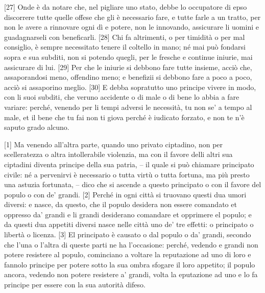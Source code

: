 {[}27{]} Onde è da notare che, nel pigliare uno stato, debbe lo
occupatore di epso discorrere tutte quelle offese che gli è necessario
fare, e tutte farle a un tratto, per non le avere a rinnovare ogni dì e
potere, non le innovando, assicurare li uomini e guadagnarseli con
beneficarli. {[}28{]} Chi fa altrimenti, o per timidità o per mal
consiglio, è sempre necessitato tenere il coltello in mano; né mai può
fondarsi sopra e sua subditi, non si potendo quegli, per le fresche e
continue iniurie, mai assicurare di lui. {[}29{]} Per che le iniurie si
debbono fare tutte insieme, acciò che, assaporandosi meno, offendino
meno; e benefizii si debbono fare a poco a poco, acciò si assaporino
meglio. {[}30{]} E debba sopratutto uno principe vivere in modo, con li
suoi subditi, che veruno accidente o di male o di bene lo abbia a fare
variare: perché, venendo per li tempi adversi le necessità, tu non se' a
tempo al male, et il bene che tu fai non ti giova perché è iudicato
forzato, e non te n'è saputo grado alcuno.


{[}1{]} Ma venendo all'altra parte, quando uno privato ciptadino, non
per scelleratezza o altra intollerabile violenzia, ma con il favore
delli altri sua ciptadini diventa principe della sua patria, -- il quale
si può chiamare principato civile: né a pervenirvi è necessario o tutta
virtù o tutta fortuna, ma più presto una astuzia fortunata, -- dico che si ascende a questo principato o con il favore del populo o con de' grandi. {[}2{]} Perché in ogni città si truovano questi dua umori diversi: e nasce, da questo, che il populo desidera non essere comandato et oppresso da' grandi e li grandi desiderano comandare et opprimere el populo; e da questi dua appetiti diversi nasce nelle città uno de' tre effetti: o principato o libertà o licenza. {[}3{]} El principato è causato o dal populo o da' grandi, secondo che l'una o l'altra di queste parti ne ha l'occasione: perché, vedendo e grandi non potere resistere al populo, cominciano a voltare la reputazione ad uno di loro e fannolo principe per potere sotto la sua ombra sfogare il loro appetito; il populo ancora, vedendo non potere resistere a' grandi, volta la eputazione ad uno e lo fa principe per essere con la sua autorità difeso.

